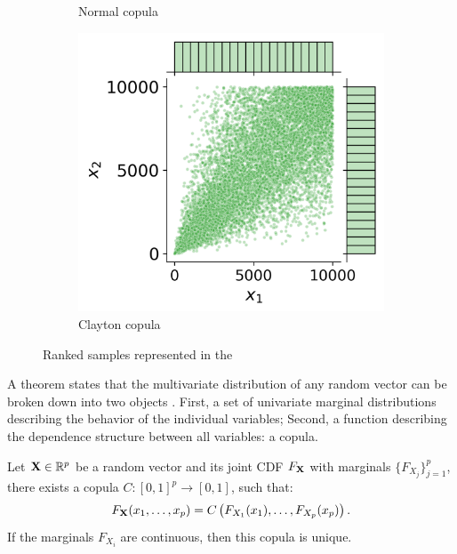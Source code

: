 \begin{figure}[ht]
\begin{subfigure}[b]{0.32\textwidth}
        \caption{Normal copula}
    \end{subfigure}
    \hfill
    \begin{subfigure}[b]{0.32\textwidth}
        \centering
        \includegraphics[width=\textwidth]{../numerical_experiments/chapter1/figures/clayton_copula_ranked.png}
        \caption{Clayton copula}
    \end{subfigure}
       \caption{Ranked samples represented in the }
       \label{fig:ranked_joint_dist_samples}
\end{figure}

A theorem states that the multivariate distribution of any random vector can be broken down into two objects \citep{joe_1997}. 
First, a set of univariate marginal distributions describing the behavior of the individual variables;
Second, a function describing the dependence structure between all variables: a copula. 

\begin{theorem}
    Let $\mathbf{X} \in \mathbb{R}^p$ be a random vector and its joint CDF $F_{{\bf X}}$ with marginals $\{F_{X_j}\}_{j=1}^p$, there exists a copula $C: [0, 1]^p \rightarrow [0, 1]$, such that:
    \begin{equation}
        F_{{\bf X}}(x_1, \dots, x_p) = C\left(F_{X_1}(x_1), \dots, F_{X_p}(x_p)\right). 
    \end{equation}
    If the marginals $F_{X_i}$ are continuous, then this copula is unique.
    \label{thm:sklar}
\end{theorem}

